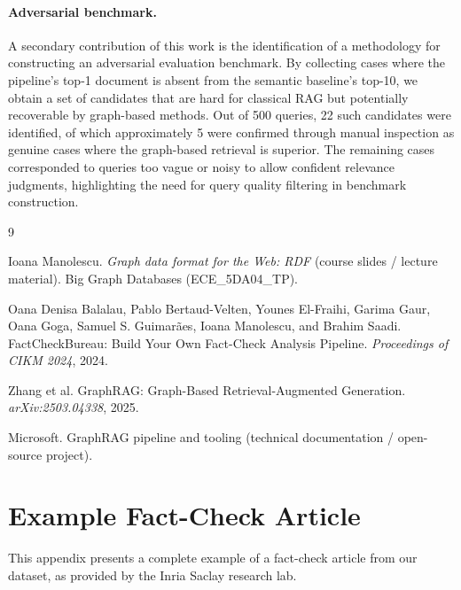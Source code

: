 \documentclass[10pt]{article}
\begin{document}
\paragraph{Adversarial benchmark.} A secondary contribution of this work is the identification of a methodology for constructing an adversarial evaluation benchmark. By collecting cases where the pipeline's top-1 document is absent from the semantic baseline's top-10, we obtain a set of candidates that are hard for classical RAG but potentially recoverable by graph-based methods. Out of 500 queries, 22 such candidates were identified, of which approximately 5 were confirmed through manual inspection as genuine cases where the graph-based retrieval is superior. The remaining cases corresponded to queries too vague or noisy to allow confident relevance judgments, highlighting the need for query quality filtering in benchmark construction.




\begin{thebibliography}{9}

Ioana Manolescu.
\newblock \emph{Graph data format for the Web: RDF} (course slides / lecture material).
\newblock Big Graph Databases (ECE\_5DA04\_TP).

Oana Denisa Balalau, Pablo Bertaud-Velten, Younes El-Fraihi, Garima Gaur, Oana Goga, Samuel S. Guimar{\~a}es, Ioana Manolescu, and Brahim Saadi.
\newblock FactCheckBureau: Build Your Own Fact-Check Analysis Pipeline.
\newblock \emph{Proceedings of CIKM 2024}, 2024.

Zhang et al.
\newblock GraphRAG: Graph-Based Retrieval-Augmented Generation.
\newblock \emph{arXiv:2503.04338}, 2025.

Microsoft.
\newblock GraphRAG pipeline and tooling (technical documentation / open-source project).

\end{thebibliography}

\newpage
\onecolumn
\appendix

\section{Example Fact-Check Article}
\label{app:example}

This appendix presents a complete example of a fact-check article from our dataset, as provided by the Inria Saclay research lab.
\end{document}
